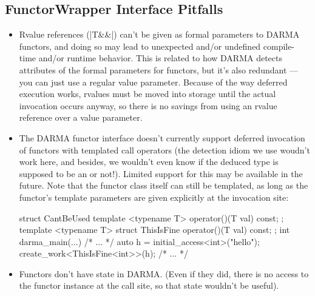 \subsection{FunctorWrapper Interface Pitfalls}

\begin{itemize}
  \item Rvalue references (|T&&|) can't be given as formal parameters to
    \gls{DARMA} functors, and doing so may lead to unexpected and/or undefined compile-time
    and/or runtime behavior.  This is related to how \gls{DARMA} detects attributes of
  the formal parameters for functors, but it's also redundant --- you can just
  use a regular value parameter.  
  Because of the way \gls{deferred execution} works, rvalues must be moved into
  storage until the actual invocation occurs anyway, so there is no savings
  from using an rvalue reference over a value parameter.
\item The \gls{DARMA} functor interface doesn't currently support deferred
  invocation of functors with templated call operators (the detection idiom we
  use woudn't work here, and besides, we wouldn't even know if the deduced type
  is supposed to be an  or not!).  Limited support for this may be
  available in the future.  Note that the functor class itself can still be
  templated, as long as the functor's template parameters are given explicitly
  at the invocation site:
\begin{CppCodeNumb}
struct CantBeUsed {
  template <typename T>
  operator()(T val) const;
};
template <typename T>
struct ThisIsFine {
  operator()(T val) const;
};
int darma_main(...) {
  /* ... */
  auto h = initial_access<int>("hello");
  create_work<ThisIsFine<int>>(h);
  /* ... */
}
\end{CppCodeNumb}
  \item Functors don't have state in \gls{DARMA}.  (Even if they did, there is no
  access to the functor instance at the call site, so that state wouldn't be useful).
\end{itemize}

\lstDeleteShortInline{\|}
